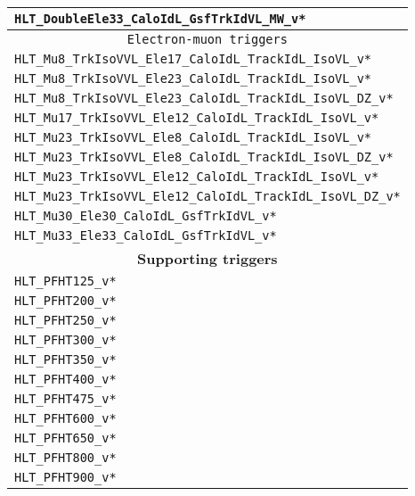 \begin{table}[ht!]
\begin{center}
\begin{tabular}{ l}
        \texttt{HLT\_DoubleEle33\_CaloIdL\_GsfTrkIdVL\_MW\_v*}               \\
        \hline 
        \multicolumn{1}{c}{\texttt{Electron-muon triggers} }             \\
        \hline 
        \texttt{HLT\_Mu8\_TrkIsoVVL\_Ele17\_CaloIdL\_TrackIdL\_IsoVL\_v*} \\
        \texttt{HLT\_Mu8\_TrkIsoVVL\_Ele23\_CaloIdL\_TrackIdL\_IsoVL\_v*}    \\
        \texttt{HLT\_Mu8\_TrkIsoVVL\_Ele23\_CaloIdL\_TrackIdL\_IsoVL\_DZ\_v*}    \\
        \texttt{HLT\_Mu17\_TrkIsoVVL\_Ele12\_CaloIdL\_TrackIdL\_IsoVL\_v*}    \\
        \texttt{HLT\_Mu23\_TrkIsoVVL\_Ele8\_CaloIdL\_TrackIdL\_IsoVL\_v*}    \\ 
        \texttt{HLT\_Mu23\_TrkIsoVVL\_Ele8\_CaloIdL\_TrackIdL\_IsoVL\_DZ\_v*} \\
        \texttt{HLT\_Mu23\_TrkIsoVVL\_Ele12\_CaloIdL\_TrackIdL\_IsoVL\_v*}    \\ 
        \texttt{HLT\_Mu23\_TrkIsoVVL\_Ele12\_CaloIdL\_TrackIdL\_IsoVL\_DZ\_v*}    \\ 
        \texttt{HLT\_Mu30\_Ele30\_CaloIdL\_GsfTrkIdVL\_v*}            \\
        \texttt{HLT\_Mu33\_Ele33\_CaloIdL\_GsfTrkIdVL\_v*}            \\
        \hline 
        \multicolumn{1}{c}{\textbf{Supporting triggers}} \\
        \hline 
        \texttt{HLT\_PFHT125\_v*}                       \\
        \texttt{HLT\_PFHT200\_v*}                       \\
        \texttt{HLT\_PFHT250\_v*}                       \\
        \texttt{HLT\_PFHT300\_v*}                       \\
        \texttt{HLT\_PFHT350\_v*}                       \\
        \texttt{HLT\_PFHT400\_v*}                       \\
        \texttt{HLT\_PFHT475\_v*}                       \\
        \texttt{HLT\_PFHT600\_v*}                       \\
        \texttt{HLT\_PFHT650\_v*}                       \\
        \texttt{HLT\_PFHT800\_v*}                       \\
        \texttt{HLT\_PFHT900\_v*}                       \\
\hline\hline
\end{tabular}
\end{center}
\end{table}

